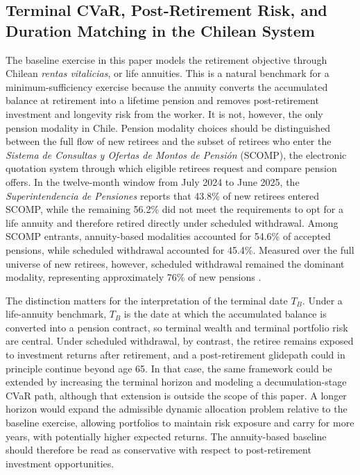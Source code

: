 \documentclass[11pt]{article}
\newcommand{\TB}{T_{B}}
\begin{document}
\iffalse
\subsection{Terminal CVaR, Post-Retirement Risk, and Duration Matching in the Chilean System}

The baseline exercise in this paper models the retirement objective through Chilean \emph{rentas vitalicias}, or life annuities. This is a natural benchmark for a minimum-sufficiency exercise because the annuity converts the accumulated balance at retirement into a lifetime pension and removes post-retirement investment and longevity risk from the worker. It is not, however, the only pension modality in Chile. Pension modality choices should be distinguished between the full flow of new retirees and the subset of retirees who enter the \emph{Sistema de Consultas y Ofertas de Montos de Pensión} (SCOMP), the electronic quotation system through which eligible retirees request and compare pension offers. In the twelve-month window from July 2024 to June 2025, the \emph{Superintendencia de Pensiones} reports that 43.8\% of new retirees entered SCOMP, while the remaining 56.2\% did not meet the requirements to opt for a life annuity and therefore retired directly under scheduled withdrawal. Among SCOMP entrants, annuity-based modalities accounted for 54.6\% of accepted pensions, while scheduled  withdrawal accounted for 45.4\%. Measured over the full universe of new retirees, however, scheduled withdrawal remained the dominant modality, representing approximately 76\% of new pensions \cite{spScomp2025}.

The distinction matters for the interpretation of the terminal date $\TB$. Under a life-annuity benchmark, $\TB$ is the date at which the accumulated balance is converted into a pension contract, so terminal wealth and terminal portfolio risk are central. Under scheduled withdrawal, by contrast, the retiree remains exposed to investment returns after retirement, and a post-retirement glidepath could in principle continue beyond age 65. In that case, the same framework could be extended by increasing the terminal horizon and modeling a decumulation-stage CVaR path, although that extension is outside the scope of this paper. A longer horizon would expand the admissible dynamic allocation problem relative to the baseline exercise, allowing portfolios to maintain risk exposure and carry for more years, with potentially higher expected returns. The annuity-based baseline should therefore be read as conservative with respect to post-retirement investment opportunities.
\end{document}
